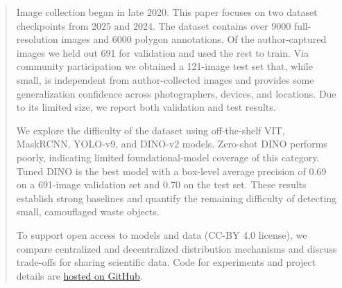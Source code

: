 \documentclass[10pt,twocolumn,letterpaper]{article}
\newcommand{\repoBase}{https://github.com/Erotemic/scatspotter/blob/31f497e2586f0d1560b9bbd65415f9bd36a07585}
\newcommand{\repoBase}{https://anonymous.4open.science/r/scatspotter-DD67}
\begin{document}
\begin{abstract}
Image collection began in late 2020.  This paper focuses on two dataset
checkpoints from 2025 and 2024.  The dataset contains over 9000
full-resolution images and 6000 polygon annotations.  Of the author-captured
images we held out 691 for validation and used the rest to train.  Via
community participation we obtained a 121-image test set that, while small, is
independent from author-collected images and provides some generalization
confidence across photographers, devices, and locations.  Due to its limited
size, we report both validation and test results.

We explore the difficulty of the dataset  using off-the-shelf VIT, MaskRCNN,
YOLO-v9, and DINO-v2 models.  Zero-shot DINO performs poorly, indicating
limited foundational-model coverage of this category.  Tuned DINO is the best
model with a box-level average precision of 0.69 on a 691-image validation set
and 0.70 on the test set.  These results establish strong baselines and
quantify the remaining difficulty of detecting small, camouflaged waste
objects.

To support open access to models and data (CC-BY 4.0 license), we
compare centralized and decentralized distribution mechanisms and discuss 
trade-offs for sharing scientific data.  Code for
experiments and project details are \href{\repoBase}{hosted on GitHub}.



\end{abstract}








\FloatBarrier

{\small


}


\ifuseappendix

%
\fi
\end{document}
